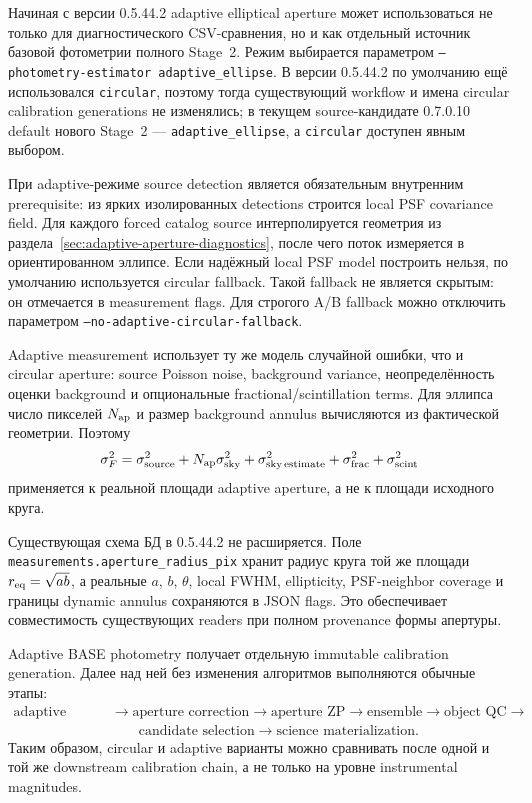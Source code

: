 Начиная с версии 0.5.44.2 adaptive elliptical aperture может использоваться не только для
диагностического CSV-сравнения, но и как отдельный источник базовой фотометрии полного Stage~2.
Режим выбирается параметром
\texttt{--photometry-estimator adaptive\_ellipse}. В версии 0.5.44.2 по умолчанию ещё использовался
\texttt{circular}, поэтому тогда существующий workflow и имена circular calibration generations не
изменялись; в текущем source-кандидате 0.7.0.10 default нового Stage~2 ---
\texttt{adaptive\_ellipse}, а \texttt{circular} доступен явным выбором.

При adaptive-режиме source detection является обязательным внутренним prerequisite: из ярких
изолированных detections строится local PSF covariance field. Для каждого forced catalog source
интерполируется геометрия из раздела~\ref{sec:adaptive-aperture-diagnostics}, после чего поток
измеряется в ориентированном эллипсе. Если надёжный local PSF model построить нельзя, по умолчанию
используется circular fallback. Такой fallback не является скрытым: он отмечается в measurement
flags. Для строгого A/B fallback можно отключить параметром
\texttt{--no-adaptive-circular-fallback}.

Adaptive measurement использует ту же модель случайной ошибки, что и circular aperture:
source Poisson noise, background variance, неопределённость оценки background и опциональные
fractional/scintillation terms. Для эллипса число пикселей $N_{\rm ap}$ и размер background annulus
вычисляются из фактической геометрии. Поэтому
\begin{equation}
 \sigma_F^2 = \sigma_{\rm source}^2 + N_{\rm ap}\sigma_{\rm sky}^2
 + \sigma_{\rm sky\,estimate}^2 + \sigma_{\rm frac}^2 + \sigma_{\rm scint}^2
\end{equation}
применяется к реальной площади adaptive aperture, а не к площади исходного круга.

Существующая схема БД в 0.5.44.2 не расширяется. Поле
\texttt{measurements.aperture\_radius\_pix} хранит радиус круга той же площади
$r_{\rm eq}=\sqrt{ab}$, а реальные $a$, $b$, $\theta$, local FWHM, ellipticity, PSF-neighbor
coverage и границы dynamic annulus сохраняются в JSON flags. Это обеспечивает совместимость
существующих readers при полном provenance формы апертуры.

Adaptive BASE photometry получает отдельную immutable calibration generation. Далее над ней без
изменения алгоритмов выполняются обычные этапы:
\begin{equation}
\begin{aligned}
 \text{adaptive BASE}&\rightarrow\text{aperture correction}\rightarrow\text{aperture ZP}
 \rightarrow\text{ensemble}\rightarrow\text{object QC}\rightarrow{}\\
 &\qquad\text{candidate selection}\rightarrow\text{science materialization}.
\end{aligned}
\end{equation}
Таким образом, circular и adaptive варианты можно сравнивать после одной и той же downstream
calibration chain, а не только на уровне instrumental magnitudes.

